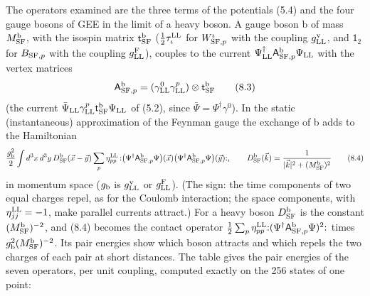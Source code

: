 \documentclass[
  10pt,
]{article}
\begin{document}
The operators examined are the three terms of the potentials (5.4) and
the four gauge bosons of GEE in the limit of a heavy boson. A gauge
boson b of mass \(M^{\rm b}_{\rm SF}\), with the isospin matrix
\(\mathsf t^{\rm b}_{\rm SF}\) (\(\tfrac12\tau^{\rm LL}_\iota\) for
\(W^\iota_{{\rm SF},p}\) with the coupling \(g^{\rm v}_{\rm LL}\), and
\(\mathsf 1_2\) for \(B_{{\rm SF},p}\) with the coupling
\(g^{\rm F}_{\rm LL}\)), couples to the current
\(\Psi^\dagger_{\rm LL}\mathsf A^{\rm b}_{{\rm SF},p}\Psi_{\rm LL}\)
with the vertex matrices
\[\mathsf A^{\rm b}_{{\rm SF},p}=(\gamma^0_{\rm LL}\gamma^p_{\rm LL})\otimes\mathsf t^{\rm b}_{\rm SF}\tag{8.3}\]
(the current
\(\bar\Psi_{\rm LL}\gamma^p_{\rm LL}\mathsf t^{\rm b}_{\rm SF}\Psi_{\rm LL}\)
of (5.2), since \(\bar\Psi=\Psi^\dagger\gamma^0\)). In the static
(instantaneous) approximation of the Feynman gauge the exchange of b
adds to the Hamiltonian
\[\frac{g_{\rm b}^2}2\int d^3x\,d^3y\,D^{\rm b}_{\rm SF}(\vec x-\vec y)\sum_p\eta^{\rm LL}_{pp}\,{:}\big(\Psi^\dagger\mathsf A^{\rm b}_{{\rm SF},p}\Psi\big)(\vec x)\big(\Psi^\dagger\mathsf A^{\rm b}_{{\rm SF},p}\Psi\big)(\vec y){:},\qquad D^{\rm b}_{\rm SF}(\vec k)=\frac1{\lvert\vec k\rvert^2+(M^{\rm b}_{\rm SF})^2}\tag{8.4}\]
in momentum space (\(g_{\rm b}\) is \(g^{\rm v}_{\rm LL}\) or
\(g^{\rm F}_{\rm LL}\)). (The sign: the time components of two equal
charges repel, as for the Coulomb interaction; the space components,
with \(\eta^{\rm LL}_{jj}=-1\), make parallel currents attract.) For a
heavy boson \(D^{\rm b}_{\rm SF}\) is the constant
\((M^{\rm b}_{\rm SF})^{-2}\), and (8.4) becomes the contact operator
\(\tfrac12\sum_p\eta^{\rm LL}_{pp}{:}(\Psi^\dagger\mathsf A^{\rm b}_{{\rm SF},p}\Psi)^2{:}\)
times \(g_{\rm b}^2(M^{\rm b}_{\rm SF})^{-2}\). Its pair energies show
which boson attracts and which repels the two charges of each pair at
short distances. The table gives the pair energies of the seven
operators, per unit coupling, computed exactly on the 256 states of one
point:
\end{document}
